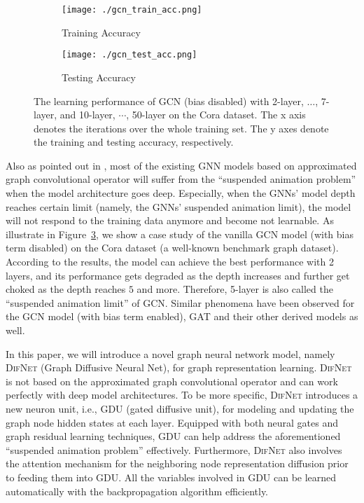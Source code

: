 \documentclass{article}
\newcommand{\our}{\textsc{DifNet}}
\newcommand{\gdu}{\textsc{GDU}}
\newcommand{\gcn}{\textsc{GCN}}
\newcommand{\gat}{\textsc{GAT}}
\begin{document}
\begin{figure}
    \centering
    \begin{subfigure}[b]{.23\textwidth}
    	\texttt{[image: ./gcn\_train\_acc.png]}
    	\caption{Training Accuracy}\label{fig:gcn_acc_train}
    \end{subfigure}\hfill
    \begin{subfigure}[b]{.23\textwidth}
    	\texttt{[image: ./gcn\_test\_acc.png]}
    	\caption{Testing Accuracy}\label{fig:gcn_acc_test}
    \end{subfigure}\caption{The learning performance of {\gcn} (bias disabled) with 2-layer, $\dotsc$, 7-layer, and 10-layer, $\cdots$, 50-layer on the Cora dataset. The x axis denotes the iterations over the whole training set. The y axes denote the training and testing accuracy, respectively.}\label{fig:gcn_acc_analysis}
\end{figure}


Also as pointed out in \cite{Zhang_GResNet_19}, most of the existing GNN models based on approximated graph convolutional operator will suffer from the ``suspended animation problem'' when the model architecture goes deep. Especially, when the GNNs' model depth reaches certain limit (namely, the GNNs' suspended animation limit), the model will not respond to the training data anymore and become not learnable. As illustrate in Figure~\ref{fig:gcn_acc_analysis}, we show a case study of the vanilla {\gcn} model (with bias term disabled) on the Cora dataset (a well-known benchmark graph dataset). According to the results, the model can achieve the best performance with 2 layers, and its performance gets degraded as the depth increases and further get choked as the depth reaches $5$ and more. Therefore, 5-layer is also called the ``suspended animation limit'' of {\gcn}. Similar phenomena have been observed for the {\gcn} model (with bias term enabled), {\gat} and their other derived models as well.

In this paper, we will introduce a novel graph neural network model, namely {\our} (Graph Diffusive Neural Net), for graph representation learning. {\our} is not based on the approximated graph convolutional operator and can work perfectly with deep model architectures. To be more specific, {\our} introduces a new neuron unit, i.e., {\gdu} (gated diffusive unit), for modeling and updating the graph node hidden states at each layer. Equipped with both neural gates and graph residual learning techniques, {\gdu} can help address the aforementioned ``suspended animation problem'' effectively. Furthermore, {\our} also involves the attention mechanism for the neighboring node representation diffusion prior to feeding them into {\gdu}. All the variables involved in {\gdu} can be learned automatically with the backpropagation algorithm efficiently.
\end{document}
